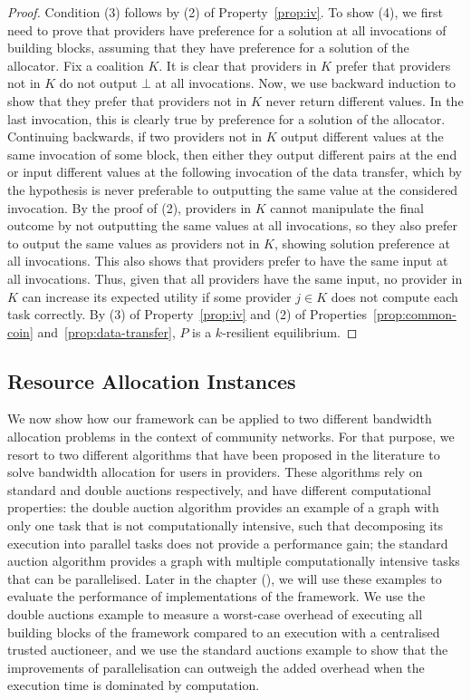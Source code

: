 \begin{proof}
Condition (3) follows by (2) of Property~\ref{prop:iv}.
To show (4), we first need to prove that providers have preference for a solution at all invocations
of building blocks, assuming that they have preference for a solution of the allocator.
Fix a coalition $K$. It is clear that providers in $K$ prefer that providers not in $K$
do not output $\bot$ at all invocations. Now, we use backward induction to show
that they prefer that providers not in $K$ never return different values.
In the last invocation, this is clearly true by preference for a solution of the allocator.
Continuing backwards, if two providers not in $K$ output different values
at the same invocation of some block, then either they output different pairs at the end or 
input different values at the following invocation of the data transfer,
which by the hypothesis is never preferable to outputting the same value at the considered invocation.
By the proof of (2), providers in $K$ cannot manipulate the final outcome
by not outputting the same values at all invocations, so
they also prefer to output the same values as providers not in $K$,
showing solution preference at all invocations. This also shows that
providers prefer to have the same input at all invocations.
Thus, given that all providers have the same input,
no provider in $K$ can increase its expected utility
if some provider $j \in K$ does not compute each task correctly.
By (3) of Property~\ref{prop:iv} and 
(2) of Properties~\ref{prop:common-coin} and~\ref{prop:data-transfer},
$P$ is a $k$-resilient equilibrium.
\end{proof}

\subsection{Resource Allocation Instances}
\label{sec__dist_auctioneer_instances}

We now show how our framework can be applied to two different bandwidth allocation problems in the context of community networks.
For that purpose, we resort to two different 
algorithms that have been proposed in the literature 
to solve bandwidth allocation for users in providers. 
These algorithms rely on standard and double auctions respectively, 
and have different computational properties: 
the double auction algorithm 
provides an example of a graph with only one task that is not computationally intensive, 
such that decomposing its execution into 
parallel tasks does not provide a performance gain; 
the standard auction algorithm provides a graph with multiple computationally 
intensive tasks that can be parallelised. 
Later in the chapter (), we will use these examples to evaluate 
the performance of implementations of the framework. 
We use the double auctions example to measure a worst-case overhead of executing all building blocks of the framework 
compared to an execution with a centralised trusted auctioneer, 
and we use the standard auctions example to show that the improvements of
parallelisation can outweigh the added overhead when the execution time is dominated by computation.

